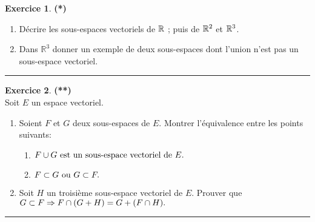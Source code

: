 \documentclass[a4paper,11pt]{article}
\theoremstyle{definition}
\newtheorem{exo}{Exercice} %
\begin{document}
\begin{minipage}{1\linewidth}
\begin{minipage}[t]{0.48\linewidth}
\begin{exo}\textbf{(*)}\quad\\[0.2cm]
\begin{enumerate}
	\item D\'ecrire les sous-espaces vectoriels de $\mathbb{R}$ ;  puis de $\mathbb{R}^2$ et $\mathbb{R}^3$.
	\item Dans $\mathbb{R}^3$ donner un exemple de deux sous-espaces dont l'union 
	n'est pas un sous-espace vectoriel.
\end{enumerate}	

\centering\rule{1\linewidth}{0.6pt}\end{exo}


\begin{exo}\textbf{(**)}\quad\\[0.2cm]
	Soit $E$ un espace vectoriel.
	\begin{enumerate}
		\item Soient $F$ et $G$ deux sous-espaces de $E$. Montrer l'équivalence entre les points suivants: 
		\begin{enumerate}[$\bullet$]
			\item $F\cup G \hbox{ est un sous-espace vectoriel de } E.$
			\item $F\subset G \hbox{ ou } G \subset F.$
		\end{enumerate}
		
		\item Soit $H$ un troisi\`eme sous-espace vectoriel de $E$. Prouver
		que
		$G \subset F \Large\Rightarrow F\cap(G+H) = G + (F\cap H) .$
	\end{enumerate}	
	
	\centering\rule{1\linewidth}{0.6pt}\end{exo}



\end{minipage}\end{minipage} \newpage 
\end{document}
